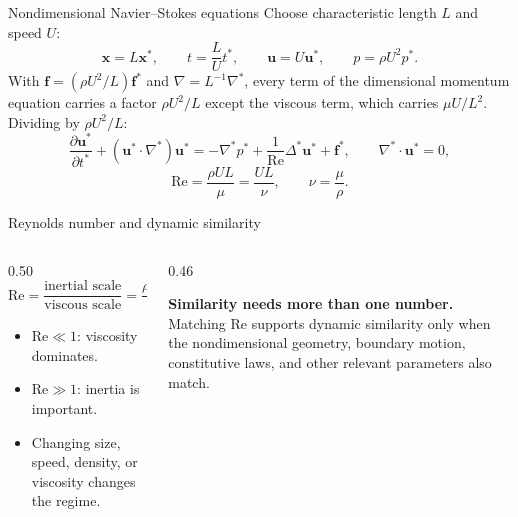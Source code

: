\documentclass[aspectratio=169,11pt]{beamer}
\newcommand{\uvec}{\bm{u}}
\newcommand{\xvec}{\bm{x}}
\newcommand{\fvec}{\bm{f}}
\begin{document}
\begin{frame}{Nondimensional Navier--Stokes equations}
Choose characteristic length \(L\) and speed \(U\):
\[
  \xvec=L\xvec^*,
  \qquad
  t=\frac{L}{U}t^*,
  \qquad
  \uvec=U\uvec^*,
  \qquad
  p=\rho U^2p^*.
\]
With \(\fvec=(\rho U^2/L)\fvec^*\) and \(\nabla=L^{-1}\nabla^*\), every term of the dimensional momentum equation carries a factor \(\rho U^2/L\) except the viscous term, which carries \(\mu U/L^2\). Dividing by \(\rho U^2/L\):
\[
  \frac{\partial\uvec^*}{\partial t^*}
  +(\uvec^*\cdot\nabla^*)\uvec^*
  =
  -\nabla^*p^*
  +\frac{1}{\mathrm{Re}}\Delta^*\uvec^*
  +\fvec^*,
  \qquad
  \nabla^*\cdot\uvec^*=0,
\]
\[
  \boxed{\mathrm{Re}=\frac{\rho UL}{\mu}=\frac{UL}{\nu}},
  \qquad \nu=\frac{\mu}{\rho}.
\]
\end{frame}

\begin{frame}{Reynolds number and dynamic similarity}
\begin{columns}[T,onlytextwidth]
\begin{column}{0.50\textwidth}
\[
  \mathrm{Re}
  =
  \frac{\text{inertial scale}}{\text{viscous scale}}
  =
  \frac{\rho UL}{\mu}.
\]
\begin{itemize}\itemsep6pt
  \item \(\mathrm{Re}\ll1\): viscosity dominates.
  \item \(\mathrm{Re}\gg1\): inertia is important.
  \item Changing size, speed, density, or viscosity changes the regime.
\end{itemize}
\end{column}
\begin{column}{0.46\textwidth}
\begin{punchbox}
\textbf{Similarity needs more than one number.}\\[3pt]
Matching \(\mathrm{Re}\) supports dynamic similarity only when the nondimensional geometry, boundary motion, constitutive laws, and other relevant parameters also match.
\end{punchbox}
\end{column}
\end{columns}
\end{frame}
\end{document}
